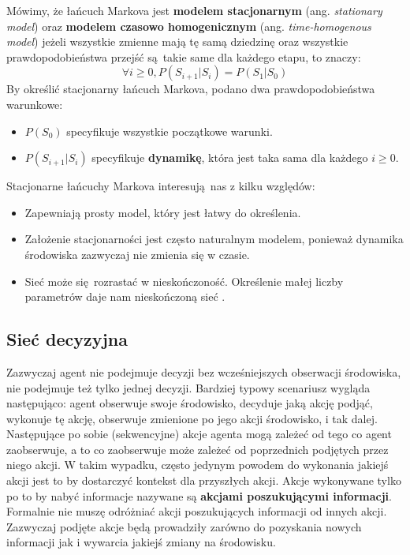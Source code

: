\documentclass[a4paper, 12pt,twoside]{report}
\begin{document}
Mówimy, że łańcuch Markova jest \textbf{modelem stacjonarnym} (ang.
\textit{stationary model}) oraz \textbf{modelem czasowo homogenicznym } (ang.
\textit{time-homogenous model}) jeżeli wszystkie zmienne mają tę samą dziedzinę
oraz wszystkie prawdopodobieństwa przejść są takie same dla każdego etapu, to
znaczy:
\[\forall i \ge 0, P(S_{i+1}|S_i) = P(S_1|S_0)\]
By określić stacjonarny łańcuch Markova, podano dwa prawdopodobieństwa
warunkowe:
\begin{itemize}
		\setlength\itemsep{-0.4em}
	\item $P(S_0)$ specyfikuje wszystkie początkowe warunki.
	\item $P(S_{i+1} | S_i)$ specyfikuje \textbf{dynamikę}, która jest taka
		sama dla każdego $i \ge 0$.
\end{itemize}
Stacjonarne łańcuchy Markova interesują nas z kilku względów:
\begin{itemize}
		\setlength\itemsep{-0.4em}
	\item Zapewniają prosty model, który jest łatwy do określenia.
	\item Założenie stacjonarności jest często naturalnym modelem, ponieważ
		dynamika środowiska zazwyczaj nie zmienia się w czasie.
	\item Sieć może się rozrastać w nieskończoność. Określenie małej liczby
		parametrów daje nam nieskończoną
		sieć \cite{ai_foundations_markov_chains}.
\end{itemize}

\subsection{Sieć decyzyjna}
Zazwyczaj agent nie podejmuje decyzji bez wcześniejszych obserwacji środowiska,
nie podejmuje też tylko jednej decyzji. Bardziej typowy scenariusz wygląda
następująco: agent obserwuje swoje środowisko, decyduje jaką akcję podjąć,
wykonuje tę akcję, obserwuje zmienione po jego akcji środowisko, i tak dalej.
Następujące po sobie (sekwencyjne) akcje agenta mogą zależeć od tego co agent
zaobserwuje, a to co zaobserwuje może zależeć od poprzednich podjętych przez
niego akcji. W takim wypadku, często jedynym powodem do wykonania jakiejś
akcji jest to by dostarczyć kontekst dla przyszłych akcji. Akcje wykonywane
tylko po to by nabyć informacje nazywane są \textbf{akcjami poszukującymi
informacji}. Formalnie nie muszę odróżniać akcji poszukujących informacji od
innych akcji. Zazwyczaj podjęte akcje będą prowadziły zarówno do pozyskania
nowych informacji jak i wywarcia jakiejś zmiany na środowisku.
\end{document}

